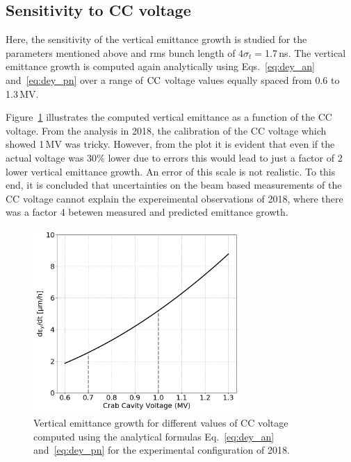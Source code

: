 \subsection{Sensitivity to CC voltage}\label{subsec:bunch_length_dependence}
Here, the sensitivity of the vertical emittance growth is studied for the parameters mentioned above and rms bunch length of $4\sigma_t=$1.7\,ns. The vertical emittance growth is computed again analytically using Eqs.~\eqref{eq:dey_an} and~\eqref{eq:dey_pn} over a range of ${\mathrm{CC}}$ voltage values equally spaced from 0.6 to 1.3\,MV. 

Figure~\ref{fig:sensitivity_VCC_theory_bunch1} illustrates the computed vertical emittance as a function of the CC voltage. From the analysis in 2018, the calibration of the CC voltage which showed 1\,MV was tricky. However, from the plot it is evident that even if the actual voltage was 30$\%$ lower due to errors this would lead to just a factor of 2 lower vertical emittance growth. An error of this scale is not realistic. To this end, it is concluded that uncertainties on the beam based measurements of the CC voltage cannot explain the expereimental observations of 2018, where there was a factor 4 betewen measured and predicted emittance growth.

\begin{figure}[!h]
    \centering         
    \includegraphics[width=0.7\textwidth]{images/Ch6/dey_vs_Vcc_Coast2-Setting2.png}
        \caption{Vertical emittance growth for different values of CC voltage computed using the analytical formulas Eq.~\eqref{eq:dey_an} and~\eqref{eq:dey_pn} for the experimental configuration of 2018.}
        \label{fig:sensitivity_VCC_theory_bunch1}
 \end{figure}

